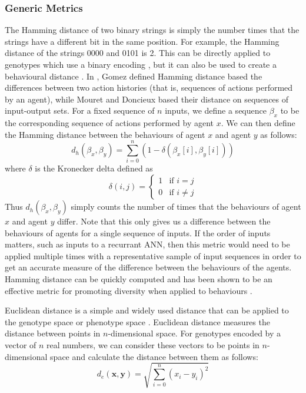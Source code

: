 \documentclass[12pt]{article} %
\begin{document}
\subsubsection{Generic Metrics}

The Hamming distance of two binary strings is simply the number times that the strings have a different bit in the same position. For example, the Hamming distance of the strings 0000 and 0101 is 2. This can be directly applied to genotypes which use a binary encoding \cite{Gomez2009}\cite{Sareni1998}, but it can also be used to create a behavioural distance \cite{Gomez2009}\cite{Mouret2012}. In \cite{Gomez2009}, Gomez defined Hamming distance based the differences between two action histories (that is, sequences of actions performed by an agent), while Mouret and Doncieux \cite{Mouret2012} based their distance on sequences of input-output sets. For a fixed sequence of $n$ inputs, we define a sequence $\beta_x$ to be the corresponding sequence of actions performed by agent $x$. We can then define the Hamming distance between the behaviours of agent $x$ and agent $y$ as follows:
\[
d_h(\beta_x,\beta_y) = \displaystyle\sum\limits_{i=0}^n \left( 1 - \delta\left(\beta_x[i], \beta_y[i]\right)\right)
\]
where $\delta$ is the Kronecker delta defined as
\[
\delta(i,j) =
 \begin{cases}
1& \text{if } i=j\\
0& \text{if } i \neq j
\end{cases}
\]
Thus $d_h(\beta_x,\beta_y)$ simply counts the number of times that the behaviours of agent $x$ and agent $y$ differ. Note that this only gives us a difference between the behaviours of agents for a single sequence of inputs. If the order of inputs matters, such as inputs to a recurrant ANN, then this metric would need to be applied multiple times with a representative sample of input sequences in order to get an accurate measure of the difference between the behaviours of the agents. Hamming distance can be quickly computed and has been shown to be an effective metric for promoting diversity when applied to behaviours \cite{Gomez2009}\cite{Mouret2012}.

Euclidean distance is a simple and widely used distance that can be applied to the genotype space or phenotype space \cite{Gomez2009}\cite{Sareni1998}. Euclidean distance measures the distance between points in $n$-dimensional space. For genotypes encoded by a vector of $n$ real numbers, we can consider these vectors to be points in $n$-dimensional space and calculate the distance between them as follows:
\[
d_e(\mathbf{x},\mathbf{y})=\sqrt{\displaystyle\sum\limits_{i=0}^n (x_i - y_i)^2}
\]
\end{document}
